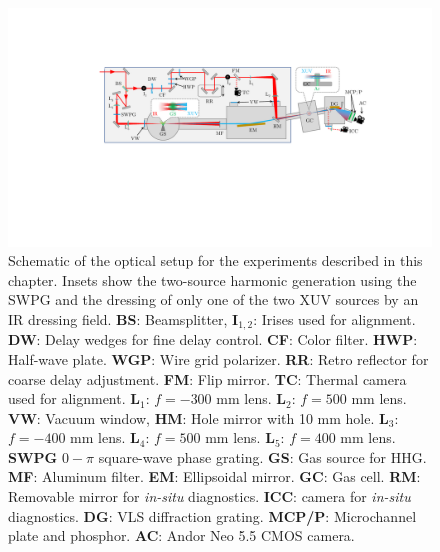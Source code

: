 \begin{figure}
	\centering
	\includegraphics[width=1.0\textwidth]{figures/CATS/beamline_schematic_CATS.pdf}
	\caption[TABLe experimental setup for CATS experiments]{Schematic of the optical setup for the experiments described in this chapter.  Insets show the two-source harmonic generation using the SWPG and the dressing of only one of the two XUV sources by an IR dressing field.  \textbf{BS}: Beamsplitter, \textbf{I$_{1,2}$}: Irises used for alignment. \textbf{DW}: Delay wedges for fine delay control. \textbf{CF}: Color filter. \textbf{HWP}: Half-wave plate. \textbf{WGP}: Wire grid polarizer. \textbf{RR}: Retro reflector for coarse delay adjustment.  \textbf{FM}: Flip mirror. \textbf{TC}: Thermal camera used for alignment.  \textbf{L$_1$}: $f=-300$ mm lens. \textbf{L$_2$}: $f=500$ mm lens. \textbf{VW}: Vacuum window, \textbf{HM}: Hole mirror with 10 mm hole.  \textbf{L$_3$}: $f=-400$ mm lens.  \textbf{L$_4$}: $f=500$ mm lens. \textbf{L$_5$}: $f=400$ mm lens. \textbf{SWPG} $0-\pi$ square-wave phase grating. \textbf{GS}: Gas source for HHG. \textbf{MF}: Aluminum filter. \textbf{EM}: Ellipsoidal mirror. \textbf{GC}: Gas cell. \textbf{RM}: Removable mirror for \textit{in-situ} diagnostics.    \textbf{ICC}: camera for \textit{in-situ} diagnostics. \textbf{DG}: VLS diffraction grating. \textbf{MCP/P}: Microchannel plate and phosphor.  \textbf{AC}: Andor Neo 5.5 CMOS camera.}
	\label{fig:CATS_setup}
\end{figure}

